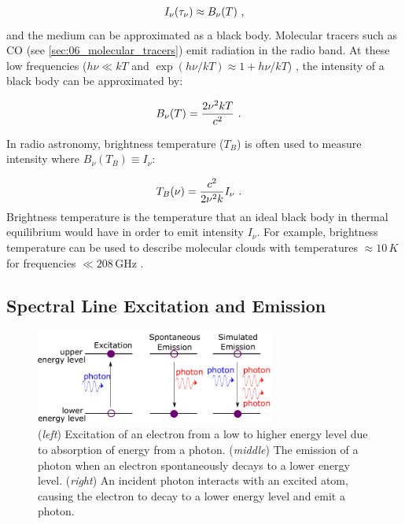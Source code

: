 \begin{equation}
    \begin{aligned}
        I_\nu\qty(\tau_\nu)\approx B_\nu\qty(T) \text{ ,}
    \end{aligned}
\end{equation}
\noindent and the medium can be approximated as a black body. Molecular tracers such as CO (see \autoref{sec:06_molecular_tracers}) emit radiation in the radio band. At these low frequencies ($h\nu\ll kT$ and $\exp(h\nu/kT)\approx1+h\nu/kT$) , the intensity of a black body can be approximated by:

\begin{equation}
    \begin{aligned}
        B_\nu\qty(T)&=\frac{2\nu^2kT}{c^2}\text{ .}
    \end{aligned}
\end{equation}

In radio astronomy, brightness temperature ($T_B$) is often used to measure intensity where $B_\nu(T_B)\equiv I_\nu$:

\begin{equation}
    \begin{aligned}
        T_B\qty(\nu)&=\frac{c^2}{2\nu^2 k}I_\nu\text{ .}
    \end{aligned} \label{eq:chapter_6_brightness_temp}
\end{equation}
\noindent Brightness temperature is the temperature that an ideal black body in thermal equilibrium would have in order to emit intensity $I_\nu$. For example, brightness temperature can be used to describe molecular clouds with temperatures $\approx 10\,\si{K}$ for frequencies $\ll 208\,\si{\giga\hertz}$ \citep{2011hea..book.....L}.

\subsection{Spectral Line Excitation and Emission} \label{sec:interstellar_medium_excitation_emission}

\begin{figure}[h]
	\centering
	\includegraphics[width=0.7\textwidth]{06_Interstellar_Medium/Images/Theory/emission.pdf}
	\caption{(\textit{left}) Excitation of an electron from a low to higher energy level due to absorption of energy from a photon. (\textit{middle}) The emission of a photon when an electron spontaneously decays to a lower energy level. (\textit{right}) An incident photon interacts with an excited atom, causing the electron to decay to a lower energy level and emit a photon.}
	\label{fig:absorption_emission}
\end{figure}

